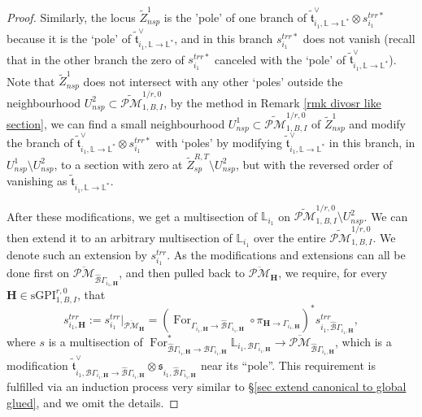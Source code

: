 \documentclass[11pt]{amsart}
\theoremstyle{definition}
\theoremstyle{remark}
\newcommand{\oPMb}{{\overline{\mathcal{PM}}}}
\newcommand{\nontilde}{}
\newcommand{\<}{\left<}
\renewcommand{\>}{\right>}
\numberwithin{equation}{section}
\def\sGPI{\text{sGPI}}
\begin{document}
\begin{proof}
         Similarly, the locus $\widetilde{Z}^{1}_{nsp}$ is the 'pole' of one branch of $\tilde{\mathfrak{t}}^{\vee}_{i_1,\mathbb L \to \mathbb L^*}\otimes \nontilde{s}^{trr*}_{i_1}$ because it is the `pole' of $\tilde{\mathfrak{t}}^{\vee}_{i_1,\mathbb L \to \mathbb L^*}$, and in this branch $\nontilde{s}^{trr*}_{i_1}$ does not vanish (recall that in the other branch the zero of $\nontilde{s}^{trr*}_{i_1}$ canceled with the `pole' of $\tilde{\mathfrak{t}}^{\vee}_{i_1,\mathbb L \to \mathbb L^*}$). 
         Note that $\widetilde{Z}^{1}_{nsp}$ does not intersect with any other `poles' outside the neighbourhood $U^2_{nsp}\subset \widetilde{\mathcal{PM}}^{1/r,0}_{1,B,I}$,  by the method in Remark \ref{rmk divosr like section}, we can find a small neighbourhood $U^{1}_{nsp}\subset \widetilde{\mathcal{PM}}^{1/r,0}_{1,B,I}$ of $\widetilde{Z}^{1}_{nsp}$ and modify the branch of $\tilde{\mathfrak{t}}^{\vee}_{i_1,\mathbb L \to \mathbb L^*}\otimes \nontilde{s}^{trr*}_{i_1}$ with `poles' by modifying $\tilde{\mathfrak{t}}^{\vee}_{i_1,\mathbb L \to \mathbb L^*}$ in this branch, in $U^{1}_{nsp}\setminus U^{2}_{nsp}$, to a section with zero at $\widetilde{Z}^{R,T}_{sp}\setminus U^{2}_{nsp}$, but with the reversed order of vanishing as $\tilde{\mathfrak{t}}_{i_1,\mathbb L \to \mathbb L^*}$.

         After these modifications, we get a multisection of $\mathbb L_{i_1}$ on $\widetilde{\mathcal{PM}}^{1/r,0}_{1,B,I}\setminus U^{2}_{nsp}$. We can then extend it to an arbitrary multisection of $\mathbb L_{i_1}$ over the entire  $\widetilde{\mathcal{PM}}^{1/r,0}_{1,B,I}$.   We denote such an extension by $s_{i_1}^{trr}$. 
         As the modifications and extensions can all be done first on $\oPMb_{\hat{\mathcal{B}}\Gamma_{i_1,\bm{H}}}$, and then pulled back to  $\oPMb_{\bm{H}}$, we require, for every $\bm{H}\in \sGPI_{1,B,I}^{r,0}$, that 
         $$s_{i_1,\bm{H}}^{trr}:=s_{i_1}^{trr}\vert_{\oPMb_{\bm{H}}}=\left(\operatorname{For}_{\Gamma_{i_1,\bm{H}} \to \hat{\mathcal B}\Gamma_{i_1,\bm{H}}}\circ\pi_{\bm{H}\to \Gamma_{i_1,\bm{H}}}\right)^* s_{i_1,\hat{\mathcal B}\Gamma_{i_1,\bm{H}}}^{trr},$$
             where $s$ is a multisection of $\operatorname{For}^*_{\hat{\mathcal B}\Gamma_{i_1,\bm{H}} \to {\mathcal B}\Gamma_{i_1,\bm{H}}}\mathbb L_{i_1,{\mathcal B}\Gamma_{i_1,\bm{H}}}\to \oPMb_{\hat{\mathcal{B}}\Gamma_{i_1,\bm{H}}}$, which is a modification $        \tilde{\mathfrak t}^\vee_{i_1,{\mathcal B}\Gamma_{i_1,\bm{H}}\to\hat{\mathcal B}\Gamma_{i_1,\bm{H}}}\otimes \mathfrak s_{i_1,\hat{\mathcal B}\Gamma_{i_1,\bm{H}}}$ near its ``pole''.  
             This requirement is fulfilled via an induction process very similar to \S \ref{sec extend canonical to global glued}, and we omit the details. 
        

\end{proof}
\end{document}
